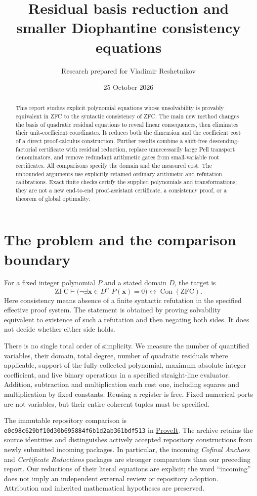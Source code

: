 \documentclass[11pt]{article}
\title{Residual basis reduction and smaller Diophantine consistency equations}
\author{Research prepared for Vladimir Reshetnikov}
\date{25 October 2026}
\theoremstyle{definition}\newtheorem{definition}[theorem]{Definition}
\theoremstyle{remark}\newtheorem{remark}[theorem]{Remark}
\newcommand{\Con}{\operatorname{Con}}
\begin{document}
\maketitle
\begin{abstract}
This report studies explicit polynomial equations whose unsolvability is
provably equivalent in ZFC to the syntactic consistency of ZFC. The main
new method changes the basis of quadratic residual equations to reveal
linear consequences, then eliminates their unit-coefficient coordinates.
It reduces both the dimension and the coefficient cost of a direct
proof-calculus construction. Further results combine a shift-free
descending-factorial certificate with residual reduction, replace
unnecessarily large Pell transport denominators, and remove redundant
arithmetic gates from small-variable root certificates.
All comparisons specify the domain and the measured cost. The unbounded
arguments use explicitly retained ordinary arithmetic and refutation
calibrations. Exact finite checks certify the supplied polynomials and
transformations; they are not a new end-to-end proof-assistant certificate,
a consistency proof, or a theorem of global optimality.
\end{abstract}
\tableofcontents
\section{The problem and the comparison boundary}
For a fixed integer polynomial $P$ and a stated domain $D$, the target is
\[
 \mathrm{ZFC}\vdash
 \bigl(\neg\exists \boldsymbol{x}\in D^n\;P(\boldsymbol{x})=0\bigr)
 \longleftrightarrow\Con(\mathrm{ZFC}).
\]
Here consistency means absence of a finite syntactic refutation in the
specified effective proof system. The statement is obtained by proving
solvability equivalent to existence of such a refutation and then negating
both sides. It does not decide whether either side holds.

There is no single total order of simplicity. We measure the number of
quantified variables, their domain, total degree, number of quadratic
residuals where applicable, support of the fully collected polynomial,
maximum absolute integer coefficient, and live binary operations in a
specified straight-line evaluator. Addition, subtraction and
multiplication each cost one, including squares and multiplication by
fixed constants. Reusing a register is free. Fixed numerical ports are
not variables, but their entire coherent tuples must be specified.

The immutable repository comparison is
\texttt{e0c98c629bf10d30b695884f6b1d2ab361bdf513} in
\href{https://github.com/VladimirReshetnikov/ProveIt}{ProveIt}.
The archive retains the source identities and distinguishes actively
accepted repository constructions from newly submitted incoming packages.
In particular, the incoming \emph{Cofinal Anchors} and \emph{Certificate
Reductions} packages are stronger comparators than our preceding report.
Our reductions of their literal equations are explicit; the word
``incoming'' does not imply an independent external review or repository
adoption. Attribution and inherited mathematical hypotheses are preserved.
\end{document}
